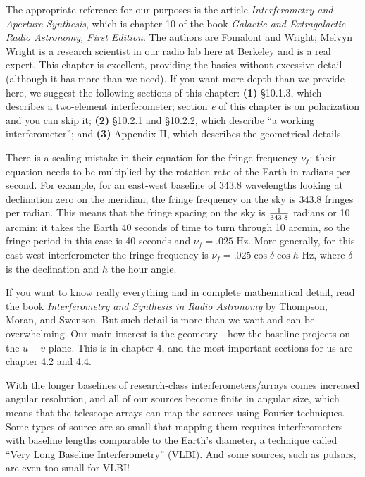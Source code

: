 \documentclass[11pt,preprint]{aastex}
\begin{document}
	The appropriate reference for our purposes is the article {\it
Interferometry and Aperture Synthesis}, which is chapter 10 of the book
{\it Galactic and Extragalactic Radio Astronomy, First Edition}.  The
authors are Fomalont and Wright; Melvyn Wright is a research scientist
in our radio lab here at Berkeley and is a real expert.  This chapter is
excellent, providing the basics without excessive detail (although it
has more than we need).  If you want more depth than we provide here, we
suggest the following sections of this chapter: {\bf (1)} \S10.1.3,
which describes a two-element interferometer; section {\it e} of this
chapter is on polarization and you can skip it; {\bf (2)} \S10.2.1 and
\S10.2.2, which describe ``a working interferometer''; and {\bf (3)}
Appendix II, which describes the geometrical details. 

	There is a scaling mistake in their equation for the fringe
frequency $\nu_f$: their equation needs to be multiplied by the rotation
rate of the Earth in radians per second.  For example, for an east-west
baseline of 343.8 wavelengths looking at declination zero on the
meridian, the fringe frequency on the sky is 343.8 fringes per radian. 
This means that the fringe spacing on the sky is ${1 \over 343.8}$
radians or 10 arcmin; it takes the Earth 40 seconds of time to turn
through 10 arcmin, so the fringe period in this case is 40 seconds and
$\nu_f = .025$ Hz.  More generally, for this east-west interferometer
the fringe frequency is $\nu_f = .025 \cos \delta \cos h$ Hz, where
$\delta$ is the declination and $h$ the hour angle. 

	If you want to know really everything and in complete
mathematical detail, read the book {\it Interferometry and Synthesis in
Radio Astronomy} by Thompson, Moran, and Swenson.  But such detail is
more than we want and can be overwhelming.  Our main interest is the
geometry---how the baseline projects on the $u-v$ plane.  This is in
chapter 4, and the most important sections for us are chapter 4.2 and
4.4. 

With the longer baselines of research-class interferometers/arrays comes
increased angular resolution, and all of our sources become finite in
angular size, which means that the telescope arrays can map the sources
using Fourier techniques. Some types of source are so small that mapping
them requires interferometers with baseline lengths comparable to the
Earth's diameter, a technique called ``Very Long Baseline
Interferometry'' (VLBI). And some sources, such as pulsars, are even too
small for VLBI!
\end{document}
